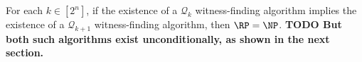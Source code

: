 \documentclass{article}
\newcommand{\todo}[1]{\textbf{TODO #1}}
\newcommand{\mc}{\mathcal}
\begin{document}
\begin{conjecture}
  For each $k \in \left[2^n\right]$, if the existence of a $\mc{Q}_k$ witness-finding algorithm implies the existence of a $\mc{Q}_{k + 1}$ witness-finding algorithm, then $\RP = \NP$.
  \todo{But both such algorithms exist unconditionally, as shown in the next section.}
\end{conjecture}



\end{document}
